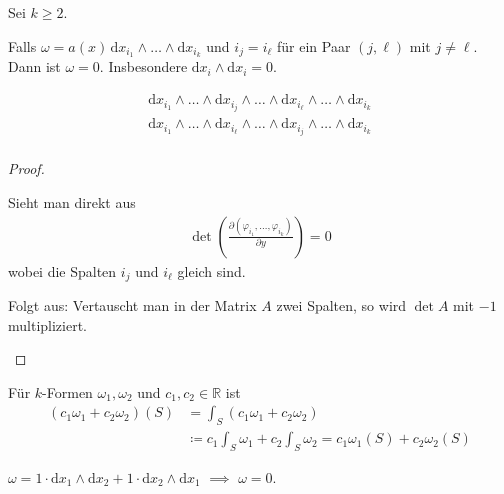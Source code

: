 \documentclass[a4paper,10pt]{scrbook}
\begin{document}
\begin{notice}[Eigenschaften:] \label{thm:12.7}
  Sei $k \geq 2$.
  \begin{enum-arab}
    \item Falls $\omega = a(x) \, \mathrm{d}x_{i_1} \wedge \ldots \wedge \mathrm{d}x_{i_k}$ und $i_j = i_\ell$ für ein Paar $(j,\ell)$ mit $j \neq \ell$. Dann ist $\omega = 0$. Insbesondere $\mathrm{d}x_i \wedge \mathrm{d}x_i = 0$.

    \item
    \begin{gather*}
      \mathrm{d}x_{i_1} \wedge \ldots \wedge \mathrm{d}x_{i_j} \wedge \ldots \wedge \mathrm{d}x_{i_\ell} \wedge \ldots \wedge \mathrm{d}x_{i_k} \\
      \mathrm{d}x_{i_1} \wedge \ldots \wedge \mathrm{d}x_{i_\ell} \wedge \ldots \wedge \mathrm{d}x_{i_j} \wedge \ldots \wedge \mathrm{d}x_{i_k} \\
    \end{gather*}
  \end{enum-arab}

  \begin{proof}
    \begin{enum-arab}
      \item Sieht man direkt aus
      \begin{align*}
        \det \left( \frac{\partial (\varphi_{i_1} ,\ldots, \varphi_{i_k})}{\partial y} \right) = 0
      \end{align*}
      wobei die Spalten $i_j$ und $i_\ell$ gleich sind.

      \item Folgt aus: Vertauscht man in der Matrix $A$ zwei Spalten, so wird $\det A$ mit $-1$ multipliziert.
    \end{enum-arab}
  \end{proof}
\end{notice}

\begin{notice} \label{thm:12.8}
  Für $k$-Formen $\omega_1,\omega_2$ und $c_1, c_2 \in \mathbb{R}$ ist
  \begin{align*}
    (c_1 \omega_1 + c_2 \omega_2)(S)
    &= \int_S (c_1 \omega_1 + c_2 \omega_2) \\
    &\coloneq c_1 \int_S \omega_1 + c_2 \int_S \omega_2 = c_1 \omega_1(S) + c_2 \omega_2(S)
  \end{align*}
\end{notice}

\begin{example} \label{thm:12.9}
  $\omega = 1 \cdot \mathrm{d}x_1 \wedge \mathrm{d}x_2 + 1 \cdot \mathrm{d}x_2 \wedge \mathrm{d}x_1$ $\implies$ $\omega = 0$.
\end{example}
\end{document}

